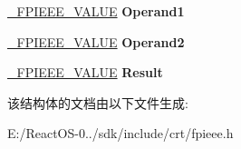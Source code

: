 \begin{DoxyCompactItemize}
\mbox{\label{struct___f_p_i_e_e_e___r_e_c_o_r_d_afe6d1da0c03565bf55f6e4563c481e90}} 
\hyperlink{struct___f_p_i_e_e_e___v_a_l_u_e}{\+\_\+\+F\+P\+I\+E\+E\+E\+\_\+\+V\+A\+L\+UE} {\bfseries Operand1}
\item 
\mbox{\label{struct___f_p_i_e_e_e___r_e_c_o_r_d_a3a94dcf0e93ef531e993f08af77e702c}} 
\hyperlink{struct___f_p_i_e_e_e___v_a_l_u_e}{\+\_\+\+F\+P\+I\+E\+E\+E\+\_\+\+V\+A\+L\+UE} {\bfseries Operand2}
\item 
\mbox{\label{struct___f_p_i_e_e_e___r_e_c_o_r_d_ad8e074c195fe12cb3f15f41d6731195c}} 
\hyperlink{struct___f_p_i_e_e_e___v_a_l_u_e}{\+\_\+\+F\+P\+I\+E\+E\+E\+\_\+\+V\+A\+L\+UE} {\bfseries Result}
\end{DoxyCompactItemize}


该结构体的文档由以下文件生成\+:\begin{DoxyCompactItemize}
\item 
E\+:/\+React\+O\+S-\/0../sdk/include/crt/fpieee.\+h\end{DoxyCompactItemize}
